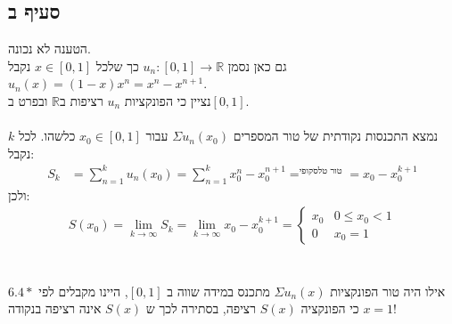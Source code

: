 \documentclass{article}
\DeclareMathOperator*{\equals}{=}
\def\reals{\mathbb{R}}
\begin{document}
\subsection*{סעיף ב}

הטענה לא נכונה. \\
גם כאן נסמן $u_n: [0,1]\rightarrow \reals$ כך שלכל $x\in[0,1]$ נקבל $u_n(x)=(1-x)x^n=x^n-x^{n+1}$. \\
נציין כי הפונקציות $u_n$ רציפות ב$\reals$ ובפרט ב$[0,1]$. \\\\
נמצא התכנסות נקודתית של טור המספרים $\Sigma u_n(x_0)$ עבור $x_0\in[0,1]$ כלשהו. לכל $k$ נקבל:
\begin{align*}
    S_k & =\sum_{n=1}^k u_n(x_0)=\sum_{n=1}^k x_0^{n}-x_0^{n+1} \equals^{\text{טור טלסקופי}}= x_0 - x_0^{k+1}
\end{align*}
ולכן:
\begin{align*}
    S(x_0)=
    \lim_{k\rightarrow \infty} S_k=
    \lim_{k\rightarrow \infty} x_0 - x_0^{k+1}=
    \begin{cases}
        x_0 & 0\leq x_0 < 1 \\
        0   & x_0 = 1
    \end{cases}
\end{align*}
\\\\
אילו היה טור הפונקציות $\Sigma u_n(x)$ מתכנס במידה שווה ב $[0,1]$, היינו מקבלים לפי $6.4*$ כי הפונקציה $S(x)$ רציפה, בסתירה לכך ש $S(x)$ אינה רציפה בנקודה $x=1$!
\end{document}
